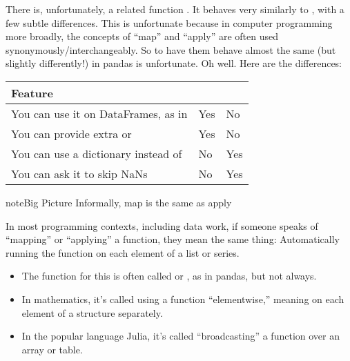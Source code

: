 \documentclass[letterpaper,10pt,english]{sphinxmanual}
\begin{document}
There is, unfortunately, a related function .  It behaves very similarly to , with a few subtle differences.  This is unfortunate because in computer programming more broadly, the concepts of “map” and “apply” are often used synonymously/interchangeably.  So to have them behave almost the same (but slightly differently!) in pandas is unfortunate.  Oh well.  Here are the differences:


\begin{savenotes}\sphinxattablestart
\centering
\begin{tabulary}{\linewidth}[t]{|T|T|T|}
\hline
\sphinxstyletheadfamily 
Feature
&\sphinxstyletheadfamily 
{}
&\sphinxstyletheadfamily 
{}
\\
\hline
You can use it on DataFrames, as in 
&
Yes
&
No
\\
\hline
You can provide extra  or 
&
Yes
&
No
\\
\hline
You can use a dictionary instead of 
&
No
&
Yes
\\
\hline
You can ask it to skip NaNs
&
No
&
Yes
\\
\hline
\end{tabulary}
\par
\sphinxattableend\end{savenotes}

\begin{sphinxadmonition}{note}{Big Picture \sphinxhyphen{} Informally, map is the same as apply}

In most programming contexts, including data work, if someone speaks of “mapping” or “applying” a function, they mean the same thing:  Automatically running the function on each element of a list or series.
\begin{itemize}
\item {} 
The function for this is often called  or , as in pandas, but not always.

\item {} 
In mathematics, it’s called using a function “elementwise,” meaning on each element of a structure separately.

\item {} 
In the popular language Julia, it’s called “broadcasting” a function over an array or table.

\end{itemize}
\end{sphinxadmonition}
\end{document}
